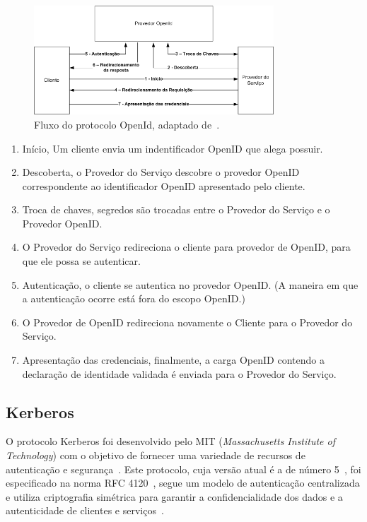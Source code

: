 \begin{figure}[!htb]
\centering
\includegraphics[width=0.8\textwidth]{openiddiagram.png}
\caption{Fluxo do protocolo OpenId, adaptado de~\cite{rfc6749}.}
\label{fig:openid}
\end{figure}

\begin{enumerate}[1 )]
\item  Início, Um cliente envia um indentificador OpenID que alega possuir.

\item  Descoberta, o Provedor do Serviço descobre o provedor OpenID correspondente ao identificador OpenID apresentado pelo cliente.

\item Troca de chaves,  segredos são trocadas entre o Provedor do Serviço e o Provedor OpenID.

\item O Provedor do Serviço redireciona o cliente para provedor de OpenID, para que ele possa se autenticar.

\item Autenticação, o cliente se autentica no provedor OpenID. (A maneira em que a autenticação ocorre está fora do escopo OpenID.)

\item O Provedor de OpenID redireciona novamente o Cliente para o Provedor do Serviço.

\item Apresentação das credenciais, finalmente, a carga OpenID contendo a declaração de identidade validada é enviada para o Provedor do Serviço.

\end{enumerate}

\subsection{Kerberos}

O protocolo Kerberos foi desenvolvido pelo MIT (\emph{Massachusetts Institute of Technology}) com o objetivo de fornecer uma variedade de recursos de autenticação e segurança~\cite{coulouris2013}. Este protocolo, cuja versão atual é a de número 5~\cite{Neuman1994}, foi especificado na norma RFC 4120~\cite{rfc4120}, segue um modelo de autenticação centralizada e utiliza criptografia simétrica para garantir a confidencialidade dos dados e a autenticidade de clientes e serviços~\cite{stallings2008}.

